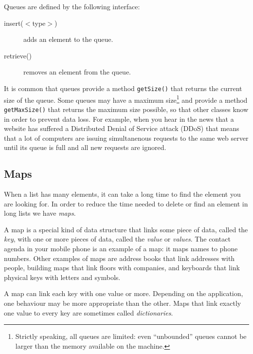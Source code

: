 Queues are defined by the following interface: 

\begin{description}
\item[insert($<$type$>$)] adds an element to the queue.
\item[retrieve() ] removes an element from the queue.
\end{description}

It is common that queues provide a method \verb+getSize()+ that
returns the current size of the queue. 
Some queues may have a
maximum size\footnote{Strictly speaking, all queues are limited: even
  ``unbounded'' queues cannot be larger than the memory available on
  the machine.} and provide a 
method \verb+getMaxSize()+ that returns the maximum size possible, so
that other classes know in order to prevent data
loss. For example, when you hear in the news that a website has
suffered a Distributed Denial of Service attack (DDoS) that means that
a lot of computers are issuing simultanenous requests to the same web
server until its queue is full and all new requests are ignored.

\subsection{Maps}
\label{sec:map}

When a list has many elements, it can take a long time to find the
element you are looking for. In order to reduce the time needed to
delete or find an element in long lists we have \emph{maps}.

A map is a special kind of data structure that links some piece of
data, called the \emph{key}, with one or more pieces of data, called
the \emph{value} or \emph{values}. The contact agenda in your mobile
phone is an example of a map: it maps names to phone numbers. Other
examples of maps are address books that link addresses with people,
building maps that link floors with companies, and keyboards that link
physical keys with letters and symbols. 

A map can link each key with one value or more. Depending on the
application, one behaviour may be more appropriate than the
other. Maps that link exactly one value to every key are sometimes
called \emph{dictionaries}. 

